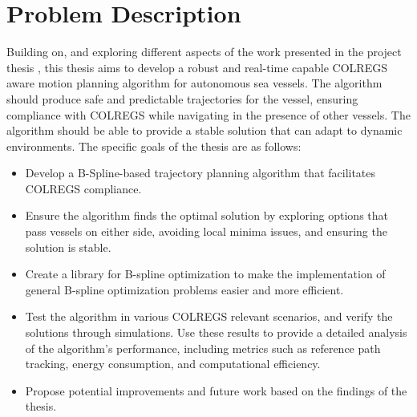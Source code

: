 



\section{Problem Description}
Building on, and exploring different aspects of the work presented in the project thesis \citet{prosjektoppgave}, this thesis aims to develop a robust and real-time capable \acrshort{COLREGS} aware motion planning algorithm for autonomous sea vessels. The algorithm should produce safe and predictable trajectories for the vessel, ensuring compliance with \acrshort{COLREGS} while navigating in the presence of other vessels. The algorithm should be able to provide a stable solution that can adapt to dynamic environments. The specific goals of the thesis are as follows:
\begin{itemize}
    \item Develop a B-Spline-based trajectory planning algorithm that facilitates COLREGS compliance.
    \item Ensure the algorithm finds the optimal solution by exploring options that pass vessels on either side, avoiding local minima issues, and ensuring the solution is stable.
    \item Create a library for B-spline optimization to make the implementation of general B-spline optimization problems easier and more efficient.
    \item Test the algorithm in various COLREGS relevant scenarios, and verify the solutions through simulations. Use these results to provide a detailed analysis of the algorithm's performance, including metrics such as reference path tracking, energy consumption, and computational efficiency.
    \item Propose potential improvements and future work based on the findings of the thesis.
\end{itemize}


